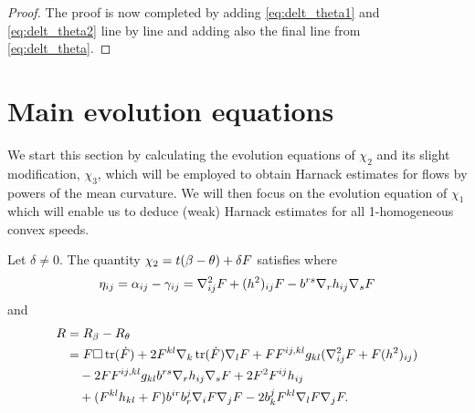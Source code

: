 \documentclass{amsart}
\begin{document}
\begin{proof}
The proof is now completed by adding \eqref{eq:delt_theta1} and \eqref{eq:delt_theta2} line by line and adding also the final line from \eqref{eq:delt_theta}.
\end{proof}

\section{Main evolution equations}
\label{sec:main_evolution}

We start this section by calculating the evolution equations of $\chi_2$ and its slight modification, $\chi_3$, which will be employed to obtain Harnack estimates for flows by powers of the mean curvature. We will then focus on the evolution equation of $\chi_1$ which will enable us to deduce (weak) Harnack estimates for all 1-homogeneous convex speeds.
\begin{proposition}
\label{thm:Evchi}
Let $\delta \neq 0.$ The quantity
$
\chi_2 = t(\beta - \theta) + \delta F
$
satisfies
where
\[
\eta_{ij} = \alpha_{ij} - \gamma_{ij} = \nabla^2_{ij}F + (h^2)_{ij}F - b^{rs}\nabla_r h_{ij}\nabla_s F
\]
and
\[
\begin{split}
R &= R_{\beta} - R_{\theta} \\
&= F \Box \operatorname{tr}(\dot{F}) + 2F^{kl} \nabla_k \operatorname{tr}(\dot{F}) \nabla_l F + F F^{ij,kl}g_{kl} (\nabla^2_{ij} F + F(h^2)_{ij})\\
&\quad- 2F F^{ij,kl}g_{kl} b^{rs}\nabla_r h_{ij}\nabla_s F + 2F^{2}F^{ij}h_{ij}\\
&\quad  +(F^{kl}h_{kl} + F)b^{ir}b^{j}_{r}\nabla_i F\nabla_jF - 2 b^{j}_{k}F^{kl}\nabla_lF\nabla_jF.
\end{split}
\]
\end{proposition}
\end{document}
